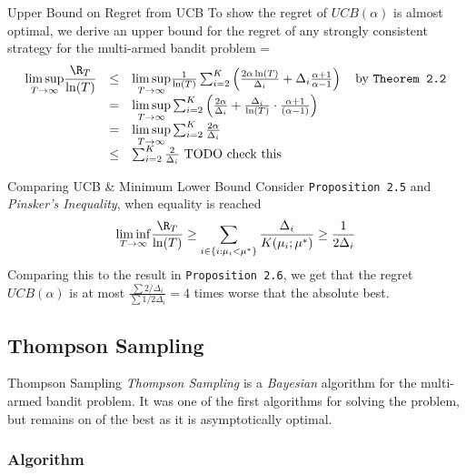 \documentclass[11pt,a4paper]{article}
\begin{document}
  \begin{proposition}{Upper Bound on Regret from UCB}
    To show the regret of $UCB(\alpha)$ is almost optimal, we derive an upper bound for the regret of any strongly consistent strategy for the multi-armed bandit problem
    \everymath={\displaystyle}
    \[\begin{array}{rcl}
      \underset{T\to\infty}{\lim\sup}\dfrac{\R_T}{\ln(T)}&\leq&\underset{T\to\infty}{\lim\sup}\frac1{\ln(T)}\sum_{i=2}^K\left(\frac{2\alpha\ln(T)}{\Delta_i}+\Delta_i\frac{\alpha+1}{\alpha-1}\right)\quad\text{by \texttt{Theorem 2.2}}\\
      &=&\underset{T\to\infty}{\lim\sup}\sum_{i=2}^K\left(\frac{2\alpha}{\Delta_i}+\frac{\Delta_i}{\ln(T)}\cdot\frac{\alpha+1}{(\alpha-1)}\right)\\
      &=&\underset{T\to\infty}{\lim\sup}\sum_{i=2}^K\frac{2\alpha}{\Delta_i}\\
      &\leq&\sum_{i=2}^K\frac2{\Delta_i} \text{ TODO check this}
    \end{array}\]
  \end{proposition}

  \begin{proposition}{Comparing UCB \& Minimum Lower Bound}
    Consider \texttt{Proposition 2.5}  and \textit{Pinsker's Inequality}, when equality is reached
    \[ \underset{T\to\infty}{\lim\inf}\dfrac{\R_T}{\ln(T)}\geq\sum_{i\in\{i:\mu_i<\mu^*\}}\frac{\Delta_i}{K(\mu_i;\mu^*)}\geq\frac1{2\Delta_i} \]
    Comparing this to the result in \texttt{Proposition 2.6}, we get that the regret $UCB(\alpha)$ is at most $\frac{\sum 2/\Delta_i}{\sum 1/2\Delta_i}=4$ times worse that the absolute best.
  \end{proposition}

\subsection{Thompson Sampling}

  \begin{remark}{Thompson Sampling}
    \textit{Thompson Sampling} is a \textit{Bayesian} algorithm for the multi-armed bandit problem. It was one of the first algorithms for solving the problem, but remains on of the best as it is asymptotically optimal.
  \end{remark}

\subsubsection{Algorithm}
\end{document}
